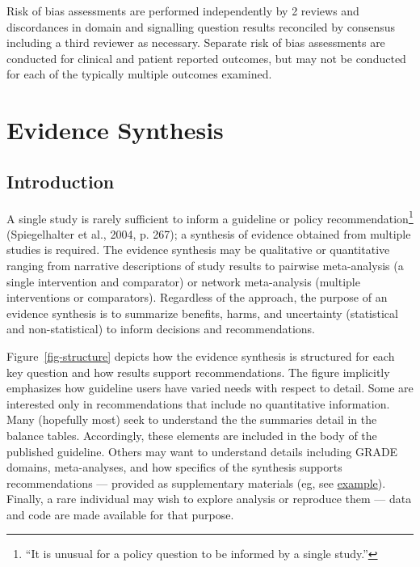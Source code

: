 \documentclass[
  letterpaper,
  DIV=11,
  numbers=noendperiod]{scrreprt}
\begin{document}
Risk of bias assessments are performed independently by 2 reviews and
discordances in domain and signalling question results reconciled by
consensus including a third reviewer as necessary. Separate risk of bias
assessments are conducted for clinical and patient reported outcomes,
but may not be conducted for each of the typically multiple outcomes
examined.


\hypertarget{evidence-synthesis}{%
\chapter{Evidence Synthesis}\label{evidence-synthesis}}

\hypertarget{introduction-1}{%
\section{Introduction}\label{introduction-1}}

A single study is rarely sufficient to inform a guideline or policy
recommendation\footnote{``It is unusual for a policy question to be
  informed by a single study.''} (Spiegelhalter et al., 2004, p. 267); a
synthesis of evidence obtained from multiple studies is required. The
evidence synthesis may be qualitative or quantitative ranging from
narrative descriptions of study results to pairwise meta-analysis (a
single intervention and comparator) or network meta-analysis (multiple
interventions or comparators). Regardless of the approach, the purpose
of an evidence synthesis is to summarize benefits, harms, and
uncertainty (statistical and non-statistical) to inform decisions and
recommendations.

Figure~\ref{fig-structure} depicts how the evidence synthesis is
structured for each key question and how results support
recommendations. The figure implicitly emphasizes how guideline users
have varied needs with respect to detail. Some are interested only in
recommendations that include no quantitative information. Many
(hopefully most) seek to understand the the summaries detail in the
balance tables. Accordingly, these elements are included in the body of
the published guideline. Others may want to understand details including
GRADE domains, meta-analyses, and how specifics of the synthesis
supports recommendations --- provided as supplementary materials (eg,
see \href{https://mdgrant.github.io/geriatrics_synth/}{example}).
Finally, a rare individual may wish to explore analysis or reproduce
them --- data and code are made available for that purpose.
\end{document}
